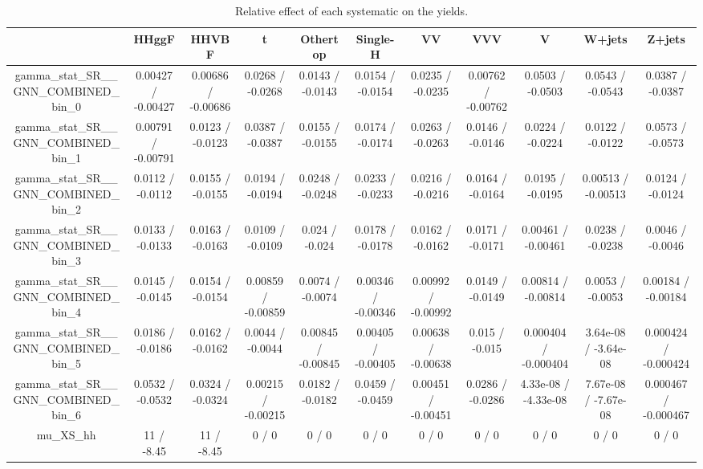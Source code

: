 \documentclass[10pt]{article}
\begin{document}
\begin{table}[htbp]
\begin{center}
\begin{tabular}{|c|c|c|c|c|c|c|c|c|c|c|}
\hline 
      & HHggF      & HHVBF      & t      & Othertop      & Single-H      & VV      & VVV      & V      & W+jets      & Z+jets \\ 
\hline 
  gamma_stat_SR__GNN_COMBINED_bin_0 & 0.00427 / -0.00427 & 0.00686 / -0.00686 & 0.0268 / -0.0268 & 0.0143 / -0.0143 & 0.0154 / -0.0154 & 0.0235 / -0.0235 & 0.00762 / -0.00762 & 0.0503 / -0.0503 & 0.0543 / -0.0543 & 0.0387 / -0.0387 \\ 
  gamma_stat_SR__GNN_COMBINED_bin_1 & 0.00791 / -0.00791 & 0.0123 / -0.0123 & 0.0387 / -0.0387 & 0.0155 / -0.0155 & 0.0174 / -0.0174 & 0.0263 / -0.0263 & 0.0146 / -0.0146 & 0.0224 / -0.0224 & 0.0122 / -0.0122 & 0.0573 / -0.0573 \\ 
  gamma_stat_SR__GNN_COMBINED_bin_2 & 0.0112 / -0.0112 & 0.0155 / -0.0155 & 0.0194 / -0.0194 & 0.0248 / -0.0248 & 0.0233 / -0.0233 & 0.0216 / -0.0216 & 0.0164 / -0.0164 & 0.0195 / -0.0195 & 0.00513 / -0.00513 & 0.0124 / -0.0124 \\ 
  gamma_stat_SR__GNN_COMBINED_bin_3 & 0.0133 / -0.0133 & 0.0163 / -0.0163 & 0.0109 / -0.0109 & 0.024 / -0.024 & 0.0178 / -0.0178 & 0.0162 / -0.0162 & 0.0171 / -0.0171 & 0.00461 / -0.00461 & 0.0238 / -0.0238 & 0.0046 / -0.0046 \\ 
  gamma_stat_SR__GNN_COMBINED_bin_4 & 0.0145 / -0.0145 & 0.0154 / -0.0154 & 0.00859 / -0.00859 & 0.0074 / -0.0074 & 0.00346 / -0.00346 & 0.00992 / -0.00992 & 0.0149 / -0.0149 & 0.00814 / -0.00814 & 0.0053 / -0.0053 & 0.00184 / -0.00184 \\ 
  gamma_stat_SR__GNN_COMBINED_bin_5 & 0.0186 / -0.0186 & 0.0162 / -0.0162 & 0.0044 / -0.0044 & 0.00845 / -0.00845 & 0.00405 / -0.00405 & 0.00638 / -0.00638 & 0.015 / -0.015 & 0.000404 / -0.000404 & 3.64e-08 / -3.64e-08 & 0.000424 / -0.000424 \\ 
  gamma_stat_SR__GNN_COMBINED_bin_6 & 0.0532 / -0.0532 & 0.0324 / -0.0324 & 0.00215 / -0.00215 & 0.0182 / -0.0182 & 0.0459 / -0.0459 & 0.00451 / -0.00451 & 0.0286 / -0.0286 & 4.33e-08 / -4.33e-08 & 7.67e-08 / -7.67e-08 & 0.000467 / -0.000467 \\ 
  mu_XS_hh & 11 / -8.45 & 11 / -8.45 & 0 / 0 & 0 / 0 & 0 / 0 & 0 / 0 & 0 / 0 & 0 / 0 & 0 / 0 & 0 / 0 \\ 
\hline 
\end{tabular} 
\caption{Relative effect of each systematic on the yields.} 
\end{center} 
\end{table} 
\end{document}
